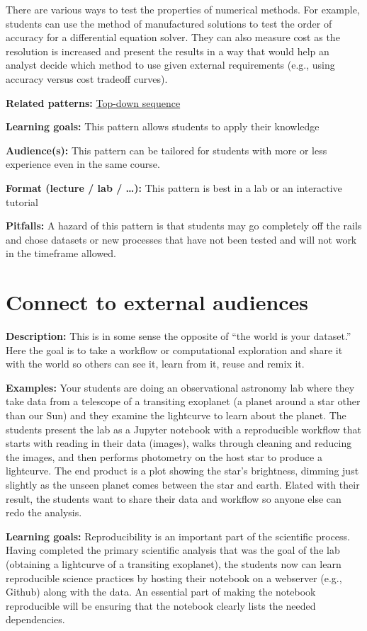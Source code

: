 \documentclass[]{book}
\begin{document}
There are various ways to test the properties of numerical methods. For
example, students can use the method of manufactured solutions to test
the order of accuracy for a differential equation solver. They can also
measure cost as the resolution is increased and present the results in a
way that would help an analyst decide which method to use given external
requirements (e.g., using accuracy versus cost tradeoff curves).

\textbf{Related patterns:}
\protect\hyperlink{top-down-sequence}{Top-down sequence}

\textbf{Learning goals:} This pattern allows students to apply their
knowledge

\textbf{Audience(s):} This pattern can be tailored for students with
more or less experience even in the same course.

\textbf{Format (lecture / lab / \ldots{}):} This pattern is best in a
lab or an interactive tutorial

\textbf{Pitfalls:} A hazard of this pattern is that students may go
completely off the rails and chose datasets or new processes that have
not been tested and will not work in the timeframe allowed.

\section{Connect to external
audiences}\label{connect-to-external-audiences}

\textbf{Description:} This is in some sense the opposite of ``the world
is your dataset.'' Here the goal is to take a workflow or computational
exploration and share it with the world so others can see it, learn from
it, reuse and remix it.

\textbf{Examples:} Your students are doing an observational astronomy
lab where they take data from a telescope of a transiting exoplanet (a
planet around a star other than our Sun) and they examine the lightcurve
to learn about the planet. The students present the lab as a Jupyter
notebook with a reproducible workflow that starts with reading in their
data (images), walks through cleaning and reducing the images, and then
performs photometry on the host star to produce a lightcurve. The end
product is a plot showing the star's brightness, dimming just slightly
as the unseen planet comes between the star and earth. Elated with their
result, the students want to share their data and workflow so anyone
else can redo the analysis.

\textbf{Learning goals:} Reproducibility is an important part of the
scientific process. Having completed the primary scientific analysis
that was the goal of the lab (obtaining a lightcurve of a transiting
exoplanet), the students now can learn reproducible science practices by
hosting their notebook on a webserver (e.g., Github) along with the
data. An essential part of making the notebook reproducible will be
ensuring that the notebook clearly lists the needed dependencies.
\end{document}
